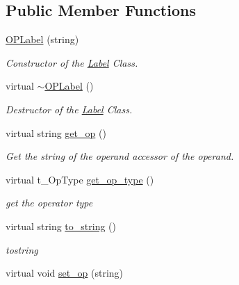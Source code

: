 \subsection*{Public Member Functions}
\begin{DoxyCompactItemize}
\item 
\hypertarget{classOPLabel_a5405b78894658047362a328e750f88b4}{
\hyperlink{classOPLabel_a5405b78894658047362a328e750f88b4}{OPLabel} (string)}
\label{classOPLabel_a5405b78894658047362a328e750f88b4}

\begin{DoxyCompactList}\small\item\em Constructor of the \hyperlink{classLabel}{Label} Class. \item\end{DoxyCompactList}\item 
\hypertarget{classOPLabel_ab25553d41606e880a622e09d5c09129d}{
virtual \hyperlink{classOPLabel_ab25553d41606e880a622e09d5c09129d}{$\sim$OPLabel} ()}
\label{classOPLabel_ab25553d41606e880a622e09d5c09129d}

\begin{DoxyCompactList}\small\item\em Destructor of the \hyperlink{classLabel}{Label} Class. \item\end{DoxyCompactList}\item 
\hypertarget{classOPLabel_a1c933d10a7b2267bae3bea6c385d466f}{
virtual string \hyperlink{classOPLabel_a1c933d10a7b2267bae3bea6c385d466f}{get\_\-op} ()}
\label{classOPLabel_a1c933d10a7b2267bae3bea6c385d466f}

\begin{DoxyCompactList}\small\item\em Get the string of the operand accessor of the operand. \item\end{DoxyCompactList}\item 
virtual t\_\-OpType \hyperlink{classOPLabel_a1a6ec701c549a6475d44ffcced1c23b5}{get\_\-op\_\-type} ()
\begin{DoxyCompactList}\small\item\em get the operator type \item\end{DoxyCompactList}\item 
virtual string \hyperlink{classOPLabel_a51c4e8f45422f03edcb71d472cf5e973}{to\_\-string} ()
\begin{DoxyCompactList}\small\item\em tostring \item\end{DoxyCompactList}\item 
\hypertarget{classOPLabel_a189bec8bcf7300e6e8656ce4bb443995}{
virtual void \hyperlink{classOPLabel_a189bec8bcf7300e6e8656ce4bb443995}{set\_\-op} (string)}
\label{classOPLabel_a189bec8bcf7300e6e8656ce4bb443995}


\end{DoxyCompactItemize}
